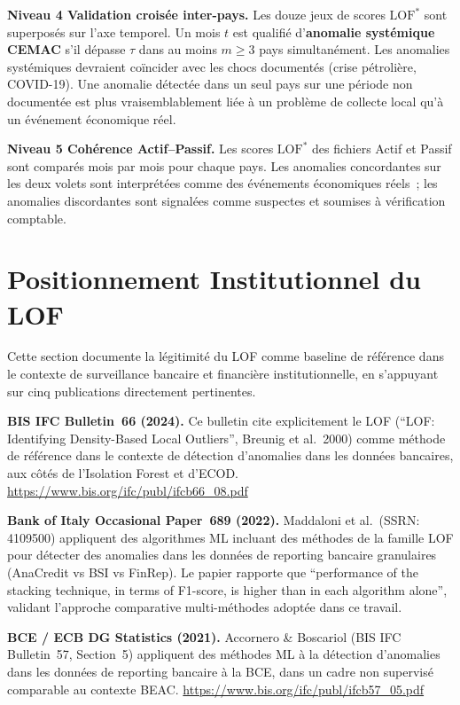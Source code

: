 \documentclass[12pt,a4paper]{article}
\begin{document}
\textbf{Niveau 4  Validation croisée inter-pays.}
Les douze jeux de scores $\mathrm{LOF}^*$ sont superposés sur l'axe temporel.
Un mois $t$ est qualifié d'\textbf{anomalie systémique CEMAC} s'il dépasse
$\tau$ dans au moins $m \geq 3$ pays simultanément. Les anomalies systémiques
devraient coïncider avec les chocs documentés (crise pétrolière, COVID-19).
Une anomalie détectée dans un seul pays sur une période non documentée est
plus vraisemblablement liée à un problème de collecte local qu'à un événement
économique réel.

\textbf{Niveau 5  Cohérence Actif--Passif.}
Les scores $\mathrm{LOF}^*$ des fichiers Actif et Passif sont comparés mois
par mois pour chaque pays. Les anomalies concordantes sur les deux volets
sont interprétées comme des événements économiques réels~; les anomalies
discordantes sont signalées comme suspectes et soumises à vérification
comptable.

\section{Positionnement Institutionnel du LOF}

Cette section documente la légitimité du LOF comme baseline de référence
dans le contexte de surveillance bancaire et financière institutionnelle,
en s'appuyant sur cinq publications directement pertinentes.

\textbf{BIS IFC Bulletin~66 (2024).} Ce bulletin cite explicitement le LOF
(``LOF: Identifying Density-Based Local Outliers'', Breunig et al.\ 2000)
comme méthode de référence dans le contexte de détection d'anomalies dans les
données bancaires, aux côtés de l'Isolation Forest et d'ECOD.
\url{https://www.bis.org/ifc/publ/ifcb66\_08.pdf}

\textbf{Bank of Italy Occasional Paper~689 (2022).} Maddaloni et al.\ (SSRN:
4109500) appliquent des algorithmes ML incluant des méthodes de la famille LOF
pour détecter des anomalies dans les données de reporting bancaire granulaires
(AnaCredit vs BSI vs FinRep). Le papier rapporte que ``performance of the
stacking technique, in terms of F1-score, is higher than in each algorithm
alone'', validant l'approche comparative multi-méthodes adoptée dans ce travail.

\textbf{BCE / ECB DG Statistics (2021).} Accornero \& Boscariol (BIS IFC
Bulletin~57, Section~5) appliquent des méthodes ML à la détection d'anomalies
dans les données de reporting bancaire à la BCE, dans un cadre non supervisé
comparable au contexte BEAC.
\url{https://www.bis.org/ifc/publ/ifcb57\_05.pdf}
\end{document}
